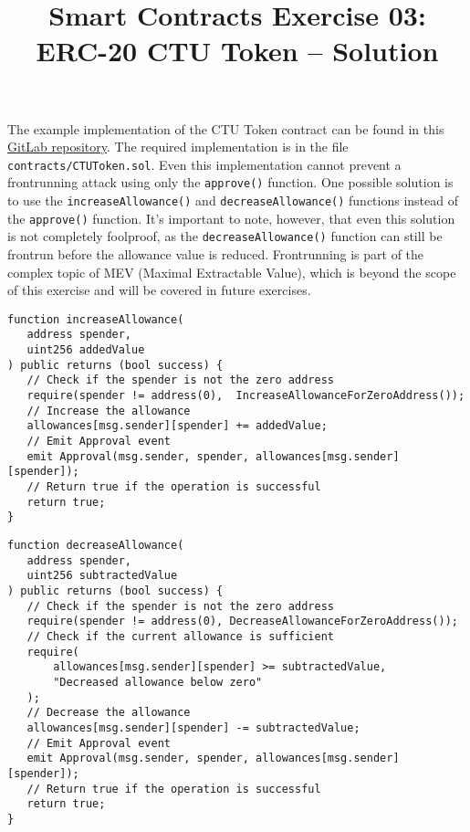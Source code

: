 \documentclass[12pt]{article}
\title{Smart Contracts Exercise 03: \\ ERC-20 CTU Token -- Solution}
\author{}
\date{}
\begin{document}
\maketitle

\noindent
The example implementation of the CTU Token contract can be found in this \href{https://gitlab.fel.cvut.cz/radovluk/smart-contracts-exercises/-/tree/main/03-ERC20-CTUToken/solution/solution-code}{GitLab repository}. The required implementation is in the file \texttt{contracts/CTUToken.sol}. Even this implementation cannot prevent a frontrunning attack using only the \texttt{approve()} function. One possible solution is to use the \texttt{increaseAllowance()} and \texttt{decreaseAllowance()} functions instead of the \texttt{approve()} function. It's important to note, however, that even this solution is not completely foolproof, as the \texttt{decreaseAllowance()} function can still be frontrun before the allowance value is reduced. Frontrunning is part of the complex topic of MEV (Maximal Extractable Value), which is beyond the scope of this exercise and will be covered in future exercises.

\noindent
\begin{minipage}{\textwidth}
\begin{lstlisting}[language=Solidity]
function increaseAllowance(
   address spender,
   uint256 addedValue
) public returns (bool success) {
   // Check if the spender is not the zero address
   require(spender != address(0),  IncreaseAllowanceForZeroAddress());
   // Increase the allowance
   allowances[msg.sender][spender] += addedValue;
   // Emit Approval event
   emit Approval(msg.sender, spender, allowances[msg.sender][spender]);
   // Return true if the operation is successful
   return true;
}
\end{lstlisting}
\end{minipage}

\noindent
\begin{minipage}{\textwidth}
\begin{lstlisting}[language=Solidity]
function decreaseAllowance(
   address spender,
   uint256 subtractedValue
) public returns (bool success) {
   // Check if the spender is not the zero address
   require(spender != address(0), DecreaseAllowanceForZeroAddress());
   // Check if the current allowance is sufficient
   require(
       allowances[msg.sender][spender] >= subtractedValue,
       "Decreased allowance below zero"
   );
   // Decrease the allowance
   allowances[msg.sender][spender] -= subtractedValue;
   // Emit Approval event
   emit Approval(msg.sender, spender, allowances[msg.sender][spender]);
   // Return true if the operation is successful
   return true;
}
\end{lstlisting}
\end{minipage}
\end{document}
